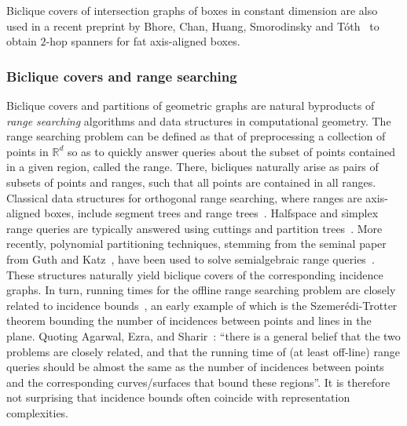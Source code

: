 \documentclass{amsart}
\newcommand{\darkblue}{\color{darkblue}} %
\newcommand{\defn}[1]{\textsl{\darkblue #1}} %
\begin{document}
Biclique covers of intersection graphs of boxes in constant dimension are also used in a recent preprint by Bhore, Chan, Huang, Smorodinsky and T\'{o}th~\cite{BCHST25} to obtain $2$-hop spanners for fat axis-aligned boxes. 

\subsubsection{Biclique covers and range searching}

Biclique covers and partitions of geometric graphs are natural byproducts of \defn{range searching} algorithms and data structures in computational geometry. The range searching problem can be defined as that of preprocessing a collection of points in $\mathbb{R}^d$ so as to quickly answer queries about the subset of points contained in a given region, called the range. There, bicliques naturally arise as pairs of subsets of points and ranges, such that all points are contained in all ranges.
Classical data structures for orthogonal range searching, where ranges are axis-aligned boxes, include segment trees and range trees~\cite[Chapters 5 and 10]{CGbook}. Halfspace and simplex range queries are typically answered using cuttings and partition trees~\cite{MR1115098,MR1174360,MR1194032,MR1220545,MR2901245}. More recently, polynomial partitioning techniques, stemming from the seminal paper from Guth and Katz~\cite{MR3272924}, have been used to solve semialgebraic range queries~\cite{MR3351757,MR4013919,AAEKS22,CS24,AES24}. These structures naturally yield biclique covers of the corresponding incidence graphs.
In turn, running times for the offline range searching problem are closely related to incidence bounds~\cite{MR2177675}, an early example of which is the Szemer\'edi-Trotter theorem bounding the number of incidences between points and lines in the plane. Quoting Agarwal, Ezra, and Sharir~\cite{AES24}: ``there is a general belief that the two problems are closely related, and that the running time of (at least off-line) range queries should be almost the same as the number of incidences between points and the corresponding curves/surfaces that bound these regions''. 
It is therefore not surprising that incidence bounds often coincide with representation complexities.
\end{document}
